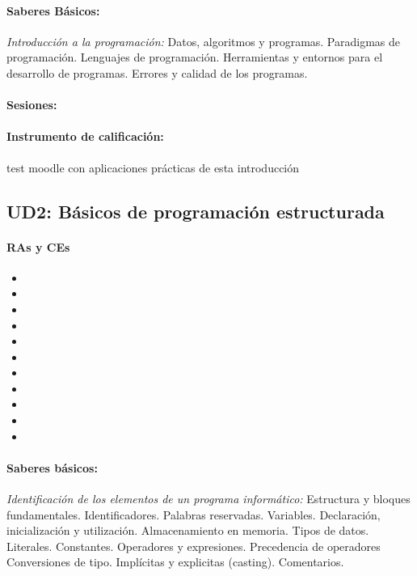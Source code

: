 	\paragraph{Saberes Básicos:} \emph{Introducción a la programación:}
		Datos, algoritmos y programas.
		Paradigmas de programación.
		Lenguajes de programación.
		Herramientas y entornos para el desarrollo de programas.
		Errores y calidad de los programas.



	\paragraph{Sesiones:} 

	\paragraph{Instrumento de calificación:} 
		test moodle con aplicaciones prácticas de esta introducción

\newpage
\subsection{UD2: Básicos de programación estructurada}

	\paragraph{RAs y CEs} 
	\begin{itemize}[itemsep=0.1em, topsep=0.1em]
		\item\RAUNOb
		\item\RAUNOc
		\item\RAUNOd
		\item\RAUNOe
		\item\RAUNOf
		\item\RAUNOg
		\item\RAUNOh
		\item\RAUNOi
		\item\RACINCOa
		\item\RACINCOb
		\item\RACINCOc
	\end{itemize}


	\paragraph{Saberes básicos:} \emph{Identificación de los elementos de un programa informático:}
		Estructura y bloques fundamentales.
		Identificadores.
		Palabras reservadas.
		Variables. Declaración, inicialización y utilización. Almacenamiento en memoria.
		Tipos de datos.
		Literales.
		Constantes.
		Operadores y expresiones. Precedencia de operadores
		Conversiones de tipo. Implícitas y explicitas (casting).
		Comentarios.

